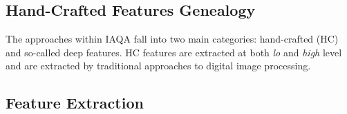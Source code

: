 \subsection{Hand-Crafted Features Genealogy}
\label{sec:handcrafted} 

The approaches within IAQA fall into two main categories: hand-crafted (HC) and so-called deep features. HC features are extracted at both \textit{lo} and \textit{high} level and are extracted by traditional approaches to digital image processing\cite{gonzalez2008digital}. 






\subsection{Feature Extraction}
